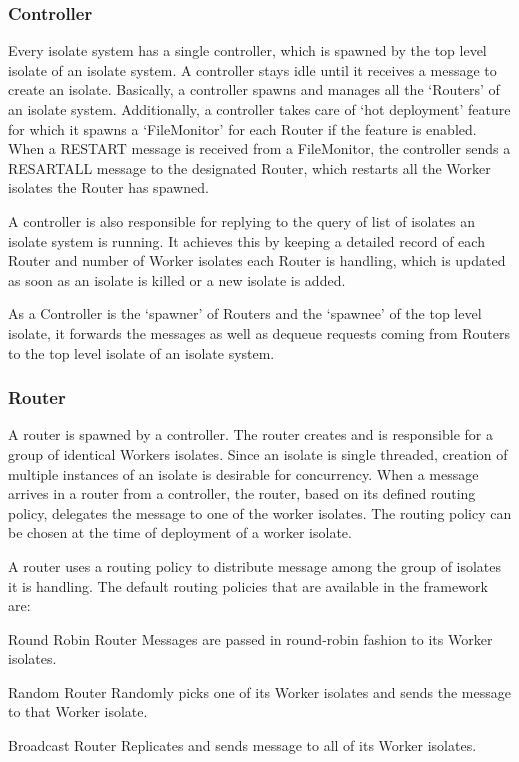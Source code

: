   \subsubsection{Controller}
  Every isolate system has a single controller, which is spawned by the top level isolate of an isolate system. A controller stays idle until it receives a message to create an isolate. Basically, a controller spawns and manages all the ‘Routers’ of an isolate system. Additionally, a controller takes care of ‘hot deployment’ feature for which it spawns a ‘FileMonitor’ for each Router if the feature is enabled. When a RESTART message is received from a FileMonitor, the controller sends a RESART\textunderscore{}ALL message to the designated Router, which restarts all the Worker isolates the Router has spawned.

  A controller is also responsible for replying to the query of list of isolates an isolate system is running. It achieves this by keeping a detailed record of each Router and number of Worker isolates each Router is handling, which is updated as soon as an isolate is killed or a new isolate is added.

  As a Controller is the ‘spawner’ of Routers and the ‘spawnee’ of the top level isolate, it forwards the messages as well as dequeue requests coming from Routers to the top level isolate of an isolate system.

  \subsubsection{Router}
  A router is spawned by a controller. The router creates and is responsible for a group of identical Workers isolates. Since an isolate is single threaded, creation of multiple instances of an isolate is desirable for concurrency. When a message arrives in a router from a controller, the router, based on its defined routing policy, delegates the message to one of the worker isolates. The routing policy can be chosen at the time of deployment of a worker isolate.

  A router uses a routing policy to distribute message among the group of isolates it is handling. The default routing policies that are available in the framework are:

  \begin{description}
    \item{Round Robin Router} \textemdash{} Messages are passed in round-robin fashion to its Worker isolates.

    \item{Random Router} \textemdash{} Randomly picks one of its Worker isolates and sends the message to that Worker isolate.

    \item{Broadcast Router} \textemdash{} Replicates and sends message to all of its Worker isolates.
  \end{description}

